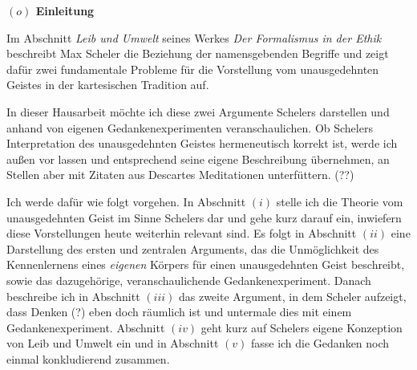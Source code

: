 \documentclass[a4paper, 12pt]{article}
\begin{document}
\begin{onehalfspace} 

\noindent\textbf{$(o)$ Einleitung}

\noindent Im Abschnitt \emph{Leib und Umwelt} seines Werkes \emph{Der Formalismus in der Ethik} beschreibt Max Scheler die Beziehung der namensgebenden Begriffe und zeigt dafür zwei fundamentale Probleme für die Vorstellung vom unausgedehnten Geistes in der kartesischen Tradition auf.%

In dieser Hausarbeit möchte ich diese zwei Argumente Schelers darstellen und anhand von eigenen Gedankenexperimenten veranschaulichen. Ob Schelers Interpretation des unausgedehnten Geistes hermeneutisch korrekt ist, werde ich außen vor lassen und entsprechend seine eigene Beschreibung übernehmen, an Stellen aber mit Zitaten aus Descartes Meditationen unterfüttern. (??) 






Ich werde dafür wie folgt vorgehen. In Abschnitt $(i)$ stelle ich die Theorie vom unausgedehnten Geist im Sinne Schelers dar und gehe kurz darauf ein, inwiefern diese Vorstellungen heute weiterhin relevant sind. Es folgt in Abschnitt $(ii)$ eine Darstellung des ersten und zentralen Arguments, das die Unmöglichkeit des Kennenlernens eines \emph{eigenen} Körpers für einen unausgedehnten Geist beschreibt, sowie das dazugehörige, veranschaulichende Gedankenexperiment. Danach beschreibe ich in Abschnitt $(iii)$ das zweite Argument, in dem Scheler aufzeigt, dass Denken (?) eben doch räumlich ist und untermale dies mit einem Gedankenexperiment. Abschnitt $(iv)$ geht kurz auf Schelers eigene Konzeption von Leib und Umwelt ein und in Abschnitt $(v)$ fasse ich die Gedanken noch einmal konkludierend zusammen. %


\end{onehalfspace}
\end{document}
